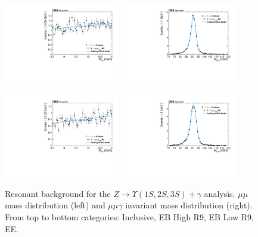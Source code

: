 \begin{figure}[!htbp]
\begin{center}
\includegraphics[width=0.45\textwidth]{figures_and_tables/fitPlotFiles2D/ZToUpsilonPhotonSignalAndBackgroundFit/mMuMNU_ZToUpsilon1SPhotonSignalAndBackgroundFit_PeakingBackground_Cat2}\hspace*{1.cm}
\includegraphics[width=0.45\textwidth]{figures_and_tables/fitPlotFiles2D/ZToUpsilonPhotonSignalAndBackgroundFit/mHZ_ZToUpsilon1SPhotonSignalAndBackgroundFit_PeakingBackground_Cat2}\hspace*{1.cm}

\includegraphics[width=0.45\textwidth]{figures_and_tables/fitPlotFiles2D/ZToUpsilonPhotonSignalAndBackgroundFit/mMuMNU_ZToUpsilon1SPhotonSignalAndBackgroundFit_PeakingBackground_Cat3}\hspace*{1.cm}
\includegraphics[width=0.45\textwidth]{figures_and_tables/fitPlotFiles2D/ZToUpsilonPhotonSignalAndBackgroundFit/mHZ_ZToUpsilon1SPhotonSignalAndBackgroundFit_PeakingBackground_Cat3}\hspace*{1.cm}


\end{center}\vspace*{-.5cm}
\caption{Resonant background for the $Z \rightarrow \Upsilon(1S,2S,3S) +\gamma$ analysis. $\mu\mu$ mass distribution (left) and $\mu\mu\gamma$ invariant mass distribution (right). From top to bottom categories: Inclusive, EB High R9, EB Low R9, EE.}
\label{fig:ZToUpsilon_PeakingBackground}
\end{figure}

